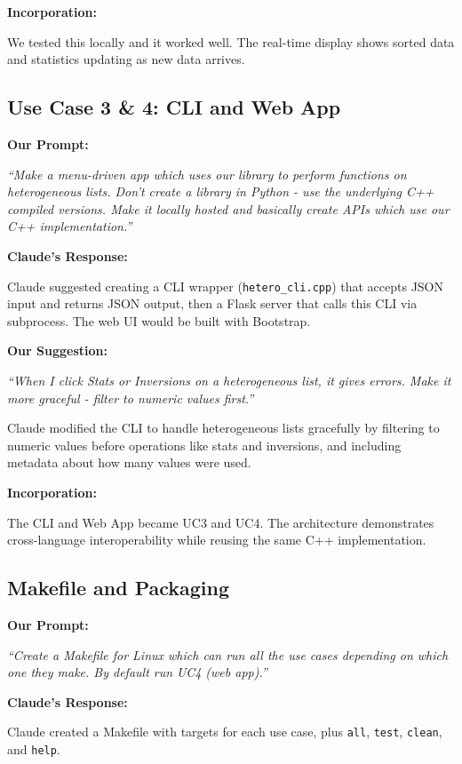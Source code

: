\documentclass[11pt,a4paper]{article}
\begin{document}
\textbf{Incorporation:}

We tested this locally and it worked well. The real-time display shows sorted data and statistics updating as new data arrives.

\subsection{Use Case 3 \& 4: CLI and Web App}

\textbf{Our Prompt:}

\textit{``Make a menu-driven app which uses our library to perform functions on heterogeneous lists. Don't create a library in Python - use the underlying C++ compiled versions. Make it locally hosted and basically create APIs which use our C++ implementation.''}

\textbf{Claude's Response:}

Claude suggested creating a CLI wrapper (\texttt{hetero\_cli.cpp}) that accepts JSON input and returns JSON output, then a Flask server that calls this CLI via subprocess. The web UI would be built with Bootstrap.

\textbf{Our Suggestion:}

\textit{``When I click Stats or Inversions on a heterogeneous list, it gives errors. Make it more graceful - filter to numeric values first.''}

Claude modified the CLI to handle heterogeneous lists gracefully by filtering to numeric values before operations like stats and inversions, and including metadata about how many values were used.

\textbf{Incorporation:}

The CLI and Web App became UC3 and UC4. The architecture demonstrates cross-language interoperability while reusing the same C++ implementation.

\subsection{Makefile and Packaging}

\textbf{Our Prompt:}

\textit{``Create a Makefile for Linux which can run all the use cases depending on which one they make. By default run UC4 (web app).''}

\textbf{Claude's Response:}

Claude created a Makefile with targets for each use case, plus \texttt{all}, \texttt{test}, \texttt{clean}, and \texttt{help}.
\end{document}
